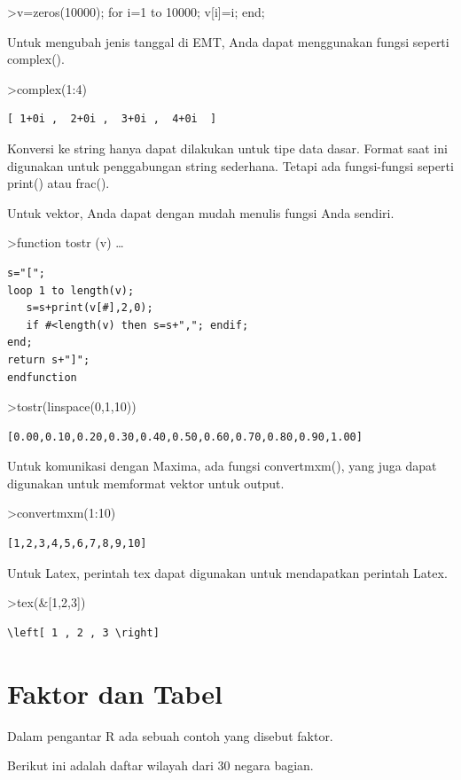 \documentclass[
]{book}
\begin{document}
\textgreater v=zeros(10000); for i=1 to 10000; v{[}i{]}=i; end;

Untuk mengubah jenis tanggal di EMT, Anda dapat menggunakan fungsi seperti complex().

\textgreater complex(1:4)

\begin{verbatim}
[ 1+0i ,  2+0i ,  3+0i ,  4+0i  ]
\end{verbatim}

Konversi ke string hanya dapat dilakukan untuk tipe data dasar. Format saat ini digunakan untuk penggabungan string sederhana. Tetapi ada fungsi-fungsi seperti print() atau frac().

Untuk vektor, Anda dapat dengan mudah menulis fungsi Anda sendiri.

\textgreater function tostr (v) \ldots{}

\begin{verbatim}
s="[";
loop 1 to length(v);
   s=s+print(v[#],2,0);
   if #<length(v) then s=s+","; endif;
end;
return s+"]";
endfunction
\end{verbatim}

\textgreater tostr(linspace(0,1,10))

\begin{verbatim}
[0.00,0.10,0.20,0.30,0.40,0.50,0.60,0.70,0.80,0.90,1.00]
\end{verbatim}

Untuk komunikasi dengan Maxima, ada fungsi convertmxm(), yang juga dapat digunakan untuk memformat vektor untuk output.

\textgreater convertmxm(1:10)

\begin{verbatim}
[1,2,3,4,5,6,7,8,9,10]
\end{verbatim}

Untuk Latex, perintah tex dapat digunakan untuk mendapatkan perintah Latex.

\textgreater tex(\&{[}1,2,3{]})

\begin{verbatim}
\left[ 1 , 2 , 3 \right] 
\end{verbatim}

\chapter{Faktor dan Tabel}\label{faktor-dan-tabel}

Dalam pengantar R ada sebuah contoh yang disebut faktor.

Berikut ini adalah daftar wilayah dari 30 negara bagian.
\end{document}

